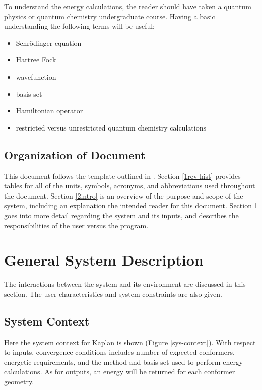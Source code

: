 \documentclass[12pt]{article}
\begin{document}
To understand the energy calculations, the reader should have taken a quantum 
physics or quantum chemistry undergraduate course. Having a basic understanding 
the following terms will be useful:
\begin{itemize}
	\item Schr\"{o}dinger equation
	\item Hartree Fock
	\item wavefunction
	\item basis set
	\item Hamiltonian operator
	\item restricted versus unrestricted quantum chemistry calculations
\end{itemize}

\subsection{Organization of Document}
This document follows the template outlined in \cite{SmithAndLai2005}. Section 
\ref{1rev-hist} provides tables for all of the units, symbols, acronyms, and 
abbreviations used throughout the document. Section \ref{2intro} is an overview 
of the purpose and scope of the system, including an 
explanation the intended 
reader for this document. Section \ref{3sys-desc} goes into more detail 
regarding the system and its inputs, and describes the responsibilities of the 
user versus the program. 

\section{General System Description} \label{3sys-desc}

The interactions between the system and its environment are discussed in this 
section. The user characteristics and system constraints are also given.

\subsection{System Context}


Here the system context for Kaplan is shown (Figure \ref{sys-context}). With 
respect to inputs, convergence conditions includes number of expected 
conformers, energetic requirements, and the method and basis set used to 
perform energy calculations. As for outputs, an energy 
will be returned for each 
conformer geometry. 
\end{document}
